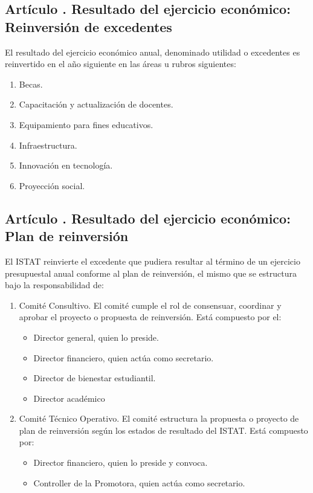 \subsection{Artículo . Resultado del ejercicio económico: Reinversión de excedentes}
\addtocounter{ns}{1}
El resultado del ejercicio económico anual, denominado utilidad o excedentes es reinvertido en el año siguiente en las áreas u rubros siguientes:  
\begin{enumerate}
\item Becas. 
\item Capacitación y actualización de docentes. 
\item Equipamiento para fines educativos. 
\item Infraestructura. 
\item Innovación en tecnología. 
\item Proyección social. 
\end{enumerate}
\subsection{Artículo . Resultado del ejercicio económico: Plan de reinversión}
\addtocounter{ns}{1}
El ISTAT reinvierte el excedente que pudiera resultar al término de un ejercicio presupuestal anual conforme al plan de reinversión, el mismo que se estructura bajo la responsabilidad de: 
\begin{enumerate}
\item Comité Consultivo. El comité cumple el rol de consensuar, coordinar y aprobar el proyecto o propuesta de reinversión. Está compuesto por el: 
\begin{itemize}
\item Director general, quien lo preside. 
\item Director financiero, quien actúa como secretario. 
\item Director de bienestar estudiantil. 
\item Director académico 
\end{itemize}
\item Comité Técnico Operativo. El comité estructura la propuesta o proyecto de plan de reinversión según los estados de resultado del ISTAT. Está compuesto por: 
\begin{itemize}
\item Director financiero, quien lo preside y convoca. 
\item Controller de la Promotora, quien actúa como secretario. 
\end{itemize}
\end{enumerate}
